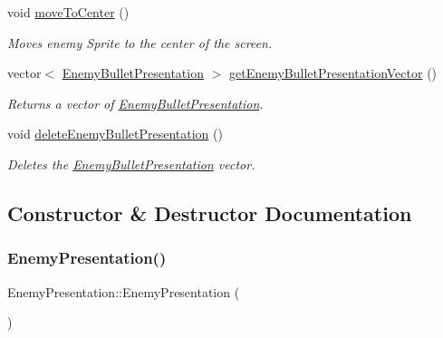 \begin{DoxyCompactItemize}
\mbox{\label{class_enemy_presentation_a8e6b10042366b1af3ddd99878cae36a9}} 
void \hyperlink{class_enemy_presentation_a8e6b10042366b1af3ddd99878cae36a9}{move\+To\+Center} ()
\begin{DoxyCompactList}\small\item\em Moves enemy Sprite to the center of the screen. \end{DoxyCompactList}\item 
vector$<$ \hyperlink{class_enemy_bullet_presentation}{Enemy\+Bullet\+Presentation} $>$ \hyperlink{class_enemy_presentation_a64c5863ad2f83c1414cf69882293e4b9}{get\+Enemy\+Bullet\+Presentation\+Vector} ()
\begin{DoxyCompactList}\small\item\em Returns a vector of \hyperlink{class_enemy_bullet_presentation}{Enemy\+Bullet\+Presentation}. \end{DoxyCompactList}\item 
\mbox{\label{class_enemy_presentation_abad20ddfb250e1c31a4d4581fa7d2571}} 
void \hyperlink{class_enemy_presentation_abad20ddfb250e1c31a4d4581fa7d2571}{delete\+Enemy\+Bullet\+Presentation} ()
\begin{DoxyCompactList}\small\item\em Deletes the \hyperlink{class_enemy_bullet_presentation}{Enemy\+Bullet\+Presentation} vector. \end{DoxyCompactList}\end{DoxyCompactItemize}


\subsection{Constructor \& Destructor Documentation}
\mbox{\label{class_enemy_presentation_aa17b851454a7bc3a86a6c20e803f5e76}} 
\subsubsection{\texorpdfstring{Enemy\+Presentation()}{EnemyPresentation()}\hspace{0.1cm}{\footnotesize\ttfamily [1/2]}}
{\footnotesize\ttfamily Enemy\+Presentation\+::\+Enemy\+Presentation (\begin{DoxyParamCaption}{ }\end{DoxyParamCaption})}

